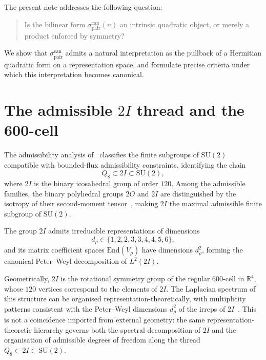\documentclass[12pt,a4paper]{article}
\theoremstyle{definition}
\theoremstyle{remark}
\begin{document}
  The present note addresses the following question:
  \begin{quote}
    Is the bilinear form $\sigma^{\mathrm{can}}_{\mathrm{pair}}(n)$ an intrinsic
    quadratic object, or merely a product enforced by symmetry?
  \end{quote}
  We show that $\sigma^{\mathrm{can}}_{\mathrm{pair}}$ admits a natural interpretation
  as the pullback of a Hermitian quadratic form on a representation space, and formulate
  precise criteria under which this interpretation becomes canonical.

  \section{The admissible $2I$ thread and the 600-cell}
  \label{sec:2I}

  The admissibility analysis of~\cite{Beau2026a1,Beau2026a3} classifies the finite
  subgroups of $\mathrm{SU}(2)$ compatible with bounded-flux admissibility constraints,
  identifying the chain
  \begin{equation}
    Q_8 \subset 2I \subset \mathrm{SU}(2),
  \end{equation}
  where $2I$ is the binary icosahedral group of order $120$.
  Among the admissible families, the binary polyhedral groups $2O$ and $2I$ are
  distinguished by the isotropy of their second-moment tensor~\cite{Beau2026a3},
  making $2I$ the maximal admissible finite subgroup of $\mathrm{SU}(2)$.

  The group $2I$ admits irreducible representations of dimensions
  \begin{equation}
    d_\rho \in \{1, 2, 2, 3, 3, 4, 4, 5, 6\},
  \end{equation}
  and its matrix coefficient spaces $\mathrm{End}(V_\rho)$ have dimensions $d_\rho^2$,
  forming the canonical Peter--Weyl decomposition of $L^2(2I)$.

  Geometrically, $2I$ is the rotational symmetry group of the regular 600-cell in
  $\mathbb{R}^4$, whose $120$ vertices correspond to the elements of $2I$.
  The Laplacian spectrum of this structure can be organised representation-theoretically,
  with multiplicity patterns consistent with the Peter--Weyl dimensions $d_\rho^2$ of
  the irreps of $2I$~\cite{Beau2026a1}.
  This is not a coincidence imported from external geometry: the same representation-theoretic
  hierarchy governs both the spectral decomposition of $2I$ and the organisation
  of admissible degrees of freedom along the thread $Q_8 \subset 2I \subset \mathrm{SU}(2)$.
\end{document}
